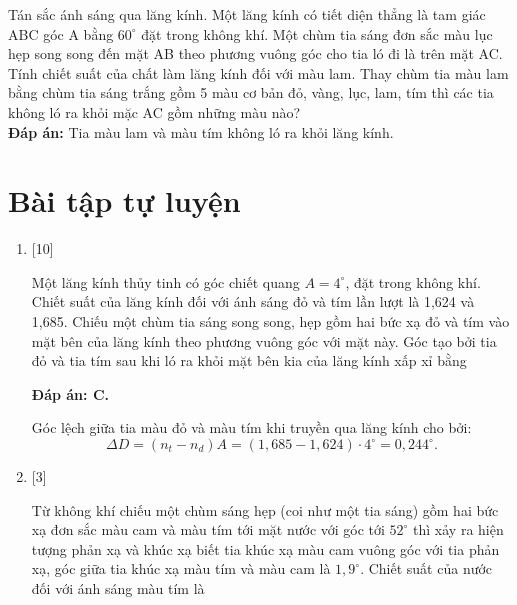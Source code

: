 \begin{dang}{Tán sắc ánh sáng qua lăng kính.}
{		Một lăng kính có tiết diện thẳng là tam giác ABC góc A bằng $60^\circ$ đặt trong không khí. Một chùm tia sáng đơn sắc màu lục hẹp song song đến mặt AB theo phương vuông góc cho tia ló đi là trên mặt AC. Tính chiết suất của chất làm lăng kính đối với màu lam. Thay chùm tia màu lam bằng chùm tia sáng trắng gồm 5 màu cơ bản đỏ, vàng, lục, lam, tím thì các tia không ló ra khỏi mặc AC gồm những màu nào? \\
		
		\textbf{Đáp án:} Tia màu lam và màu tím không ló ra khỏi lăng kính.
	}
\end{dang}

\section{Bài tập tự luyện}
\begin{enumerate}[label=\bfseries Câu \arabic*:]
	
	\item {} [10]
	\cauhoi
	{Một lăng kính thủy tinh có góc chiết quang $A = 4 ^\circ$, đặt trong không khí. Chiết suất của lăng kính đối với ánh sáng đỏ và tím lần lượt là 1,624 và 1,685. Chiếu một chùm tia sáng song song, hẹp gồm hai bức xạ đỏ và tím vào mặt bên của lăng kính theo phương vuông góc với mặt này. Góc tạo bởi tia đỏ và tia tím sau khi ló ra khỏi mặt bên kia của lăng kính xấp xỉ bằng
	}
	
	\loigiai
	{		\textbf{Đáp án: C.}
		
		Góc lệch giữa tia màu đỏ và màu tím khi truyền qua lăng kính cho bởi:
		$$
		\Delta D = (n_{t} - n_{d})A = (1,685 - 1,624) \cdot 4^\circ = 0,244^\circ.
		$$
		
	}
	
	\item {} [3]
	\cauhoi
	{Từ không khí chiếu một chùm sáng hẹp (coi như một tia sáng) gồm hai bức xạ đơn sắc màu cam và màu tím tới mặt nước với góc tới $52^\circ$  thì xảy ra hiện tượng phản xạ và khúc xạ biết tia khúc xạ màu cam vuông góc với tia phản xạ, góc giữa tia khúc xạ màu tím và màu cam là $1,9^\circ$. Chiết suất của nước đối với ánh sáng màu tím là
	}
	

\end{enumerate}
